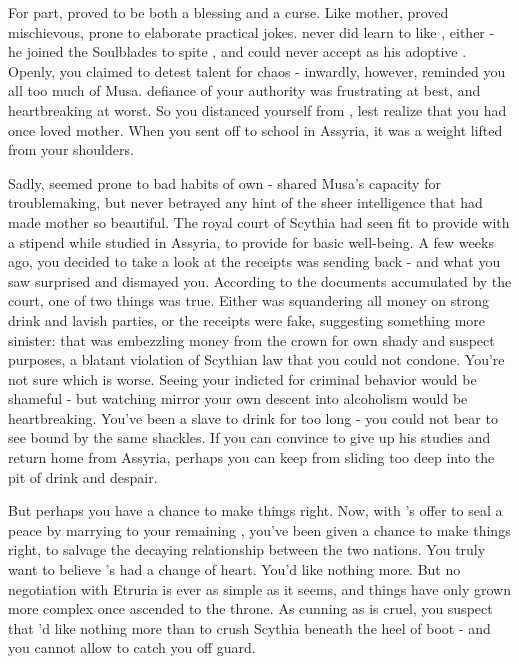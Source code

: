 \documentclass[char]{Kos}
\begin{document}
For \cWard{\their} part, \cWard{} proved to be both a blessing and a curse. Like \cWard{\their} mother, \cWard{\they} proved mischievous, prone to elaborate practical jokes. \cWard{\They} never did learn to like \cScythiaQueen{}, either - he joined the Soulblades to spite \cScythiaQueen{\them}, and could never accept \cScythiaQueen{\them} as his adoptive \cScythiaQueen{\parent}. Openly, you claimed to detest \cWard{\their} talent for chaos - inwardly, however, \cWard{\they} reminded you all too much of Musa. \cWard{\Their} defiance of your authority was frustrating at best, and heartbreaking at worst. So you distanced yourself from \cWard{\them}, lest \cScythiaQueen{} realize that you had once loved \cWard{\their} mother. When you sent \cWard{} off to school in Assyria, it was a weight lifted from your shoulders.

Sadly, \cWard{} seemed prone to bad habits of \cWard{\their} own - \cWard{\they} shared Musa's capacity for troublemaking, but never betrayed any hint of the sheer intelligence that had made \cWard{\their} mother so beautiful. The royal court of Scythia had seen fit to provide  with a stipend while \cWard{\they} studied in Assyria, to provide for \cWard{\their} basic well-being. A few weeks ago, you decided to take a look at the receipts \cWard{} was sending back - and what you saw surprised and dismayed you. According to the documents accumulated by the court, one of two things was true. Either \cWard{} was squandering all \cWard{\their} money on strong drink and lavish parties, or the receipts were fake, suggesting something more sinister: that \cWard{\they} was embezzling money from the crown for \cWard{\their} own shady and suspect purposes, a blatant violation of Scythian law that you could not condone. You're not sure which is worse. Seeing your \cWard{\offspring} indicted for criminal behavior would be shameful - but watching \cWard{\them} mirror your own descent into alcoholism would be heartbreaking. You've been a slave to drink for too long - you could not bear to see \cWard{\them} bound by the same shackles. If you can convince \cWard{\them} to give up his studies and return home from Assyria, perhaps you can keep \cWard{\them} from sliding too deep into the pit of drink and despair.

But perhaps you have a chance to make things right. Now, with \cEtruriaKing{\Monarch} \cEtruriaKing{}'s offer to seal a peace by marrying \cEtruriaKing{\their} \cGroom{\offspring} \cGroom{} to your remaining \cBride{\offspring} \cBride{}, you've been given a chance to make things right, to salvage the decaying relationship between the two nations. You truly want to believe \cEtruriaKing{\they}'s had a change of heart. You'd like nothing more. But no negotiation with Etruria is ever as simple as it seems, and things have only grown more complex once \cEtruriaKing{} ascended to the throne. As cunning as \cEtruriaKing{\they} is cruel, you suspect that \cEtruriaKing{\they}'d like nothing more than to crush Scythia beneath the heel of \cEtruriaKing{\their} boot - and you cannot allow \cEtruriaKing{\them} to catch you off guard. 
\end{document}
